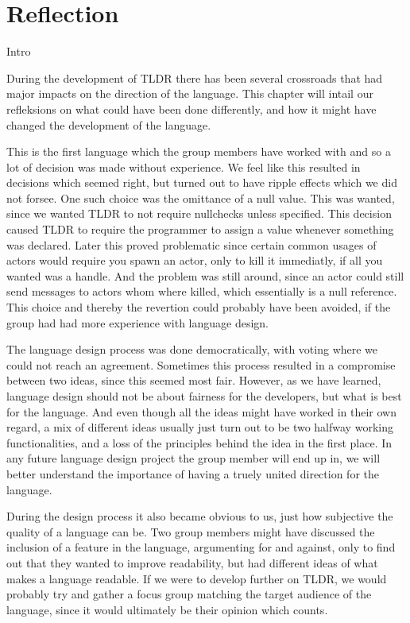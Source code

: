 \chapter{Reflection}{Intro}\label{chapter:reflection}

During the development of TLDR there has been several crossroads that had major impacts on the direction of the language. This chapter will intail our refleksions on what could have been done differently, and how it might have changed the development of the language.

This is the first language which the group members have worked with and so a lot of decision was made without experience. We feel like this resulted in decisions which seemed right, but turned out to have ripple effects which we did not forsee. One such choice was the omittance of a null value. This was wanted, since we wanted TLDR to not require nullchecks unless specified. This decision caused TLDR to require the programmer to assign a value whenever something was declared. Later this proved problematic since certain common usages of actors would require you spawn an actor, only to kill it immediatly, if all you wanted was a handle. And the problem was still around, since an actor could still send messages to actors whom where killed, which essentially is a null reference. This choice and thereby the revertion could probably have been avoided, if the group had had more experience with language design.

The language design process was done democratically, with voting where we could not reach an agreement. Sometimes this process resulted in a compromise between two ideas, since this seemed most fair. However, as we have learned, language design should not be about fairness for the developers, but what is best for the language. And even though all the ideas might have worked in their own regard, a mix of different ideas usually just turn out to be two halfway working functionalities, and a loss of the principles behind the idea in the first place. In any future language design project the group member will end up in, we will better understand the importance of having a truely united direction for the language.

During the design process it also became obvious to us, just how subjective the quality of a language can be. Two group members might have discussed the inclusion of a feature in the language, argumenting for and against, only to find out that they wanted to improve readability, but had different ideas of what makes a language readable. If we were to develop further on TLDR, we would probably try and gather a focus group matching the target audience of the language, since it would ultimately be their opinion which counts.


